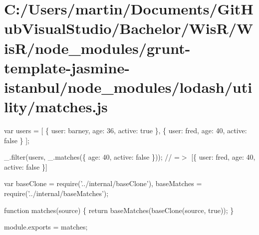 \hypertarget{_c_1_2_users_2martin_2_documents_2_git_hub_visual_studio_2_bachelor_2_wis_r_2_wis_r_2node_module5acb76ccb46917548412ebcb6b59d4bd}{}\section{C\+:/\+Users/martin/\+Documents/\+Git\+Hub\+Visual\+Studio/\+Bachelor/\+Wis\+R/\+Wis\+R/node\+\_\+modules/grunt-\/template-\/jasmine-\/istanbul/node\+\_\+modules/lodash/utility/matches.\+js}
var users = \mbox{[} \{ \textquotesingle{}user\textquotesingle{}\+: \textquotesingle{}barney\textquotesingle{}, \textquotesingle{}age\textquotesingle{}\+: 36, \textquotesingle{}active\textquotesingle{}\+: true \}, \{ \textquotesingle{}user\textquotesingle{}\+: \textquotesingle{}fred\textquotesingle{}, \textquotesingle{}age\textquotesingle{}\+: 40, \textquotesingle{}active\textquotesingle{}\+: false \} \mbox{]};

\+\_\+.\+filter(users, \+\_\+.\+matches(\{ \textquotesingle{}age\textquotesingle{}\+: 40, \textquotesingle{}active\textquotesingle{}\+: false \})); // =$>$ \mbox{[}\{ \textquotesingle{}user\textquotesingle{}\+: \textquotesingle{}fred\textquotesingle{}, \textquotesingle{}age\textquotesingle{}\+: 40, \textquotesingle{}active\textquotesingle{}\+: false \}\mbox{]}


\begin{DoxyCodeInclude}
var baseClone = require(\textcolor{stringliteral}{'../internal/baseClone'}),
    baseMatches = require(\textcolor{stringliteral}{'../internal/baseMatches'});

\textcolor{keyword}{function} matches(source) \{
  \textcolor{keywordflow}{return} baseMatches(baseClone(source, \textcolor{keyword}{true}));
\}

module.exports = matches;
\end{DoxyCodeInclude}
 